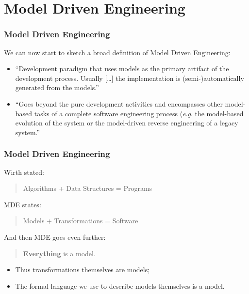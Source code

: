 \documentclass{beamer}
\newcommand{\eg}{\textit{e}.\textit{g}. }
\begin{document}
\section{Model Driven Engineering}

\begin{frame}
\frametitle{Model Driven Engineering}

We can now start to sketch a broad definition of Model Driven
Engineering:
\pause

\begin{itemize}
\item ``Development paradigm that uses models as the primary artifact
  of the development process. Usually [\ldots] the implementation is
  (semi-)automatically generated from the
  models.''\cite{brambilla2012model}
  \pause
\item ``Goes beyond the pure development activities and encompasses
  other model-based tasks of a complete software engineering process
  (\eg the model-based evolution of the system or the model-driven
  reverse engineering of a legacy system.''\cite{brambilla2012model}
\end{itemize}

\end{frame}

\begin{frame}
\frametitle{Model Driven Engineering}

Wirth stated\cite{Wirth:1978:ADS:540029}:

\begin{quote}
  Algorithms + Data Structures = Programs
\end{quote}

\pause

MDE states\cite{brambilla2012model}:

\begin{quote}
  Models + Transformations = Software
\end{quote}

\pause

And then MDE goes even further:

\begin{quote}
  \textbf{Everything} is a model.
\end{quote}

\pause

\begin{itemize}
\item Thus transformations themselves are models;
  \pause
\item The formal language we use to describe models themselves is a
  model.
\end{itemize}

\end{frame}
\end{document}
